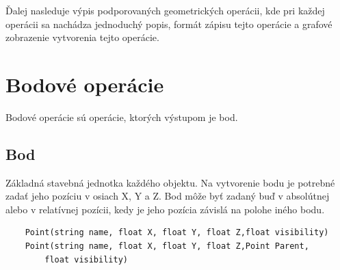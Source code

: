 
Ďalej nasleduje výpis podporovaných geometrických operácii, kde pri každej operácii sa nachádza jednoduchý popis, formát zápisu tejto operácie a grafové zobrazenie vytvorenia tejto operácie.


\section{Bodové operácie}
Bodové operácie sú operácie, ktorých výstupom je bod.
\subsection{Bod}
Základná stavebná jednotka každého objektu. Na vytvorenie bodu je potrebné zadať jeho pozíciu v osiach X, Y a Z. Bod môže byť zadaný buď v absolútnej alebo v relatívnej pozícii, kedy je jeho pozícia závislá na polohe iného bodu.
\begin{lstlisting}
    Point(string name, float X, float Y, float Z,float visibility) 
    Point(string name, float X, float Y, float Z,Point Parent,
        float visibility)
\end{lstlisting}

